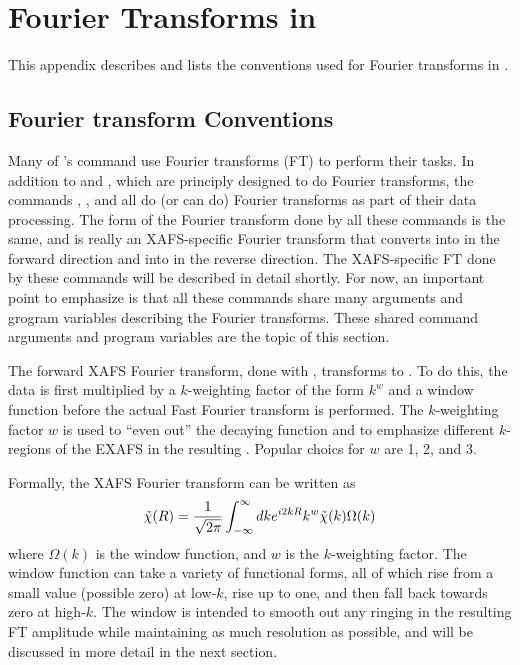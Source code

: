 
\section{Fourier Transforms in {\ifeffit} } \label{App:Fourier}

This appendix describes and lists the conventions used for Fourier
transforms in {\ifeffit}.


\subsection{Fourier transform Conventions}\label{App:Fourier:overview}

Many of {\ifeffit}'s command use Fourier transforms (FT) to perform
their tasks.  In addition to {} and {}, which
are principly designed to do Fourier transforms, the commands
{}, {}, and {} all do (or
can do) Fourier transforms as part of their data processing.  The form
of the Fourier transform done by all these commands is the same, and
is really an XAFS-specific Fourier transform that converts {\chik}
into {\chir} in the forward direction and {\chir} into {\chiq} in the
reverse direction.  The XAFS-specific FT done by these commands will
be described in detail shortly.  For now, an important point to
emphasize is that all these commands share many arguments and grogram
variables describing the Fourier transforms.  These shared command
arguments and program variables are the topic of this section.

The forward XAFS Fourier transform, done with {}, transforms
{\chik} to {\chir}.  To do this, the {\chik} data is first multiplied by a
$k$-weighting factor of the form $k^w$ and a window function before the
actual Fast Fourier transform is performed.  The $k$-weighting factor $w$
is used to ``even out'' the decaying {\chik} function and to emphasize
different $k$-regions of the EXAFS in the resulting {\chir}.  Popular
choics for $w$ are 1, 2, and 3.  

Formally, the XAFS Fourier transform can be written as
\begin{equation}
\tilde\chi(R) =  {{1}\over{\sqrt{2\pi}}} \int_{-\infty}^{\infty} {
         dk e^{i2kR} k^w \tilde\chi(k) \Omega(k) }      
\end{equation}
\noindent
where $\Omega(k)$ is the window function, and $w$ is the $k$-weighting
factor.  The window function can take a variety of functional forms, all of
which rise from a small value (possible zero) at low-$k$, rise up to one,
and then fall back towards zero at high-$k$.  The window is intended to
smooth out any ringing in the resulting FT amplitude while maintaining as
much resolution as possible, and will be discussed in more detail in the
next section.


